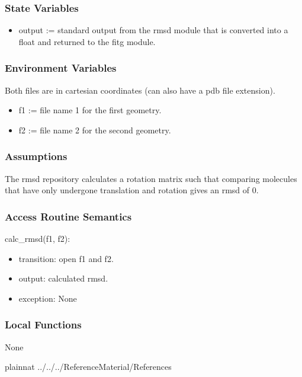 \documentclass[12pt, titlepage]{article}
\begin{document}
\subsubsection{State Variables}

\begin{itemize}
	\item output := standard output from the rmsd module that is converted into 
	a float and returned to the fitg module.
\end{itemize}

\subsubsection{Environment Variables}

Both files are in cartesian coordinates (can also have a pdb file extension).

\begin{itemize}
	\item f1 := file name 1 for the first geometry.
	\item f2 := file name 2 for the second geometry.
\end{itemize}

\subsubsection{Assumptions}

The rmsd repository calculates a rotation matrix such that comparing molecules 
that have only undergone translation and rotation gives an rmsd of 0.

\subsubsection{Access Routine Semantics}

\noindent calc\_rmsd(f1, f2):
\begin{itemize}
	\item transition: open f1 and f2.
	\item output: calculated rmsd.
	\item exception: None
\end{itemize}

\subsubsection{Local Functions}

None


 {plainnat}
 {../../../ReferenceMaterial/References}

\end{document}
